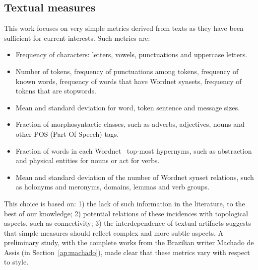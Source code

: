 \subsection{Textual measures}
This work focuses on very simple metrics derived from texts as they have been sufficient for current interests.
Such metrics are:
\begin{itemize}
    \item Frequency of characters: letters, vowels, punctuations and uppercase letters.
    \item Number of tokens, frequency of punctuations among tokens, frequency of known words, frequency of words that have Wordnet synsets, frequency of tokens that are stopwords.
    \item Mean and standard deviation for word, token sentence and message sizes.
    \item Fraction of morphosyntactic classes, such as adverbs, adjectives, nouns and other POS (Part-Of-Speech) tags.
    \item Fraction of words in each Wordnet~\cite{wordnet} top-most hypernyms,
	    such as abstraction and physical entities for nouns or act for verbs.
    \item Mean and standard deviation of the number of Wordnet synset relations, such as holonyms and meronyms, domains, lemmas and verb groups.
\end{itemize}

This choice is based on: 1) the lack of such information in the literature, to the best of our knowledge; 
2) potential relations of these incidences with topological aspects, such as connectivity;
3) the interdependence of textual artifacts suggests that simple measures should reflect complex and more subtle aspects.
A preliminary study, with the complete works from the Brazilian writer Machado de Assis (in Section~\ref{ap:machado}),
made clear that these metrics vary with respect to style.

